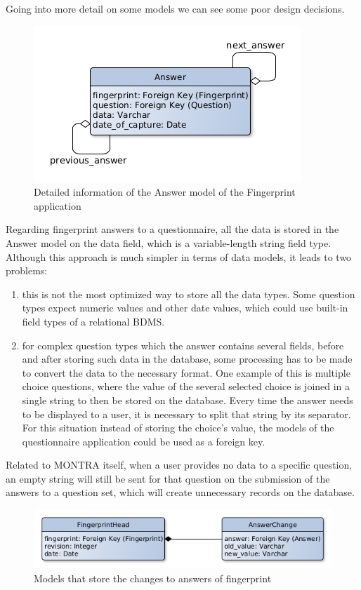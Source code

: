 Going into more detail on some models we can see some poor design decisions.

\begin{figure}[h]
    \center
    \includegraphics[width=.4\linewidth]{answer-model}
    \caption{Detailed information of the Answer model of the Fingerprint application}
    \label{fig:answer-model}
\end{figure}

Regarding fingerprint answers to a questionnaire, all the data is stored in the Answer model on the data field, which is a variable-length string field type.
Although this approach is much simpler in terms of data models, it leads to two problems:
\begin{enumerate}
    \item this is not the most optimized way to store all the data types.
        Some question types expect numeric values and other date values, which could use built-in field types of a relational BDMS.
    \item for complex question types which the answer contains several fields, before and after storing such data in the database, some processing has to be made to convert the data to the necessary format.
        One example of this is multiple choice questions, where the value of the several selected choice is joined in a single string to then be stored on the database.
        Every time the answer needs to be displayed to a user, it is necessary to split that string by its separator.
        For this situation instead of storing the choice's value, the models of the questionnaire application could be used as a foreign key.
\end{enumerate}

Related to MONTRA itself, when a user provides no data to a specific question, an empty string will still be sent for that question on the submission of the answers to a question set, which will create unnecessary records on the database.

\begin{figure}[h]
    \center
    \includegraphics[width=.6\linewidth]{answer-changes-models}
    \caption{Models that store the changes to answers of fingerprint}
    \label{fig:answer-changes-models}
\end{figure}

